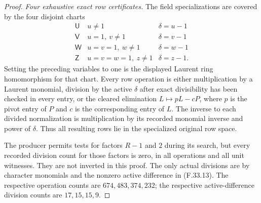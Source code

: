 \begin{proof}
\emph{Four exhaustive exact row certificates.}
The field specializations are covered by
the four disjoint charts
\[
 \begin{array}{c|l|c}
 \mathsf U&u\ne1&\delta=u-1\\
 \mathsf V&u=1,\ v\ne1&\delta=v-1\\
 \mathsf W&u=v=1,\ w\ne1&\delta=w-1\\
 \mathsf Z&u=v=w=1,\ z\ne1&\delta=z-1.
 \end{array}                                                  \tag{F.33.13}
\]
Setting the preceding variables to one
is the displayed Laurent ring
homomorphism for that chart.
Every row operation is either multiplication
by a Laurent monomial, division by the
active $\delta$ after exact divisibility
has been checked in every entry, or
the cleared elimination
$L\mapsto pL-cP$, where $p$ is the
pivot entry of $P$ and $c$ is the
corresponding entry of $L$.
The inverse to each divided normalization
is multiplication by its recorded
monomial inverse and power of $\delta$.
Thus all resulting rows lie in the
specialized original row space.

The producer permits tests for factors
$R-1$ and $2$ during its search, but
every recorded division count for those
factors is zero, in all operations and
all unit witnesses. They are not inverted
in this proof. The only actual divisions
are by character monomials and the
nonzero active difference in (F.33.13).
The respective operation counts are
$674,483,374,232$; the respective
active-difference division counts are
$17,15,15,9$.


\end{proof}

